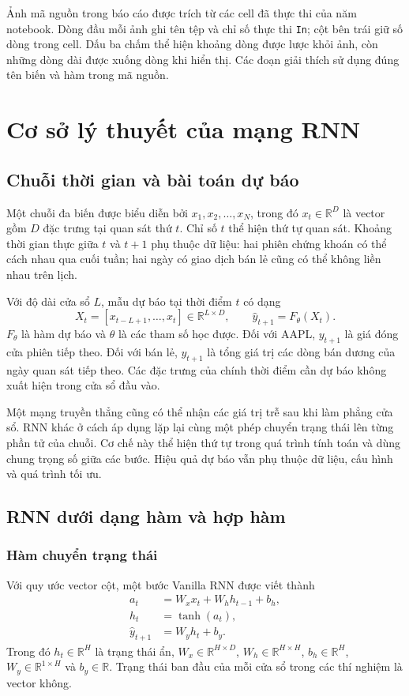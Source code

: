 \documentclass[12pt,a4paper]{report}
\begin{document}
Ảnh mã nguồn trong báo cáo được trích từ các cell đã thực thi của năm notebook. Dòng đầu mỗi ảnh ghi tên tệp và chỉ số thực thi \texttt{In}; cột bên trái giữ số dòng trong cell. Dấu ba chấm thể hiện khoảng dòng được lược khỏi ảnh, còn những dòng dài được xuống dòng khi hiển thị. Các đoạn giải thích sử dụng đúng tên biến và hàm trong mã nguồn.

\chapter{Cơ sở lý thuyết của mạng RNN}
\label{chap:theory}

\section{Chuỗi thời gian và bài toán dự báo}
Một chuỗi đa biến được biểu diễn bởi $x_1,x_2,\ldots,x_N$, trong đó $x_t\in\mathbb{R}^{D}$ là vector gồm $D$ đặc trưng tại quan sát thứ $t$. Chỉ số $t$ thể hiện thứ tự quan sát. Khoảng thời gian thực giữa $t$ và $t+1$ phụ thuộc dữ liệu: hai phiên chứng khoán có thể cách nhau qua cuối tuần; hai ngày có giao dịch bán lẻ cũng có thể không liền nhau trên lịch.

Với độ dài cửa sổ $L$, mẫu dự báo tại thời điểm $t$ có dạng
\begin{equation}
X_t=[x_{t-L+1},\ldots,x_t]\in\mathbb{R}^{L\times D},
\qquad \widehat y_{t+1}=F_\theta(X_t).
\end{equation}
$F_\theta$ là hàm dự báo và $\theta$ là các tham số học được. Đối với AAPL, $y_{t+1}$ là giá đóng cửa phiên tiếp theo. Đối với bán lẻ, $y_{t+1}$ là tổng giá trị các dòng bán dương của ngày quan sát tiếp theo. Các đặc trưng của chính thời điểm cần dự báo không xuất hiện trong cửa sổ đầu vào.

Một mạng truyền thẳng cũng có thể nhận các giá trị trễ sau khi làm phẳng cửa sổ. RNN khác ở cách áp dụng lặp lại cùng một phép chuyển trạng thái lên từng phần tử của chuỗi. Cơ chế này thể hiện thứ tự trong quá trình tính toán và dùng chung trọng số giữa các bước. Hiệu quả dự báo vẫn phụ thuộc dữ liệu, cấu hình và quá trình tối ưu.

\section{RNN dưới dạng hàm và hợp hàm}
\subsection{Hàm chuyển trạng thái}
Với quy ước vector cột, một bước Vanilla RNN được viết thành
\begin{align}
a_t &= W_xx_t+W_hh_{t-1}+b_h,\label{eq:preactivation}\\
h_t &= \tanh(a_t),\label{eq:hidden}\\
\widehat y_{t+1} &= W_yh_t+b_y.\label{eq:readout}
\end{align}
Trong đó $h_t\in\mathbb{R}^{H}$ là trạng thái ẩn, $W_x\in\mathbb{R}^{H\times D}$, $W_h\in\mathbb{R}^{H\times H}$, $b_h\in\mathbb{R}^{H}$, $W_y\in\mathbb{R}^{1\times H}$ và $b_y\in\mathbb{R}$. Trạng thái ban đầu của mỗi cửa sổ trong các thí nghiệm là vector không.
\end{document}
